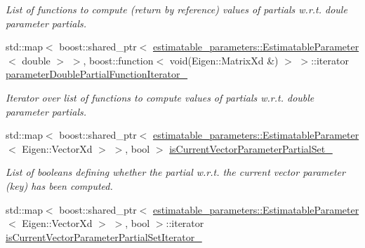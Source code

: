 \begin{DoxyCompactItemize}
\begin{DoxyCompactList}\small\item\em List of functions to compute (return by reference) values of partials w.\+r.\+t. doule parameter partials. \end{DoxyCompactList}\item 
std\+::map$<$ boost\+::shared\+\_\+ptr$<$ \hyperlink{classtudat_1_1estimatable__parameters_1_1EstimatableParameter}{estimatable\+\_\+parameters\+::\+Estimatable\+Parameter}$<$ double $>$ $>$, boost\+::function$<$ void(Eigen\+::\+Matrix\+Xd \&) $>$ $>$\+::iterator \hyperlink{classtudat_1_1orbit__determination_1_1StateDerivativePartial_a4c5d5ef3f5b9328359dfeacf9c47d19c}{parameter\+Double\+Partial\+Function\+Iterator\+\_\+}\hypertarget{classtudat_1_1orbit__determination_1_1StateDerivativePartial_a4c5d5ef3f5b9328359dfeacf9c47d19c}{}\label{classtudat_1_1orbit__determination_1_1StateDerivativePartial_a4c5d5ef3f5b9328359dfeacf9c47d19c}

\begin{DoxyCompactList}\small\item\em Iterator over list of functions to compute values of partials w.\+r.\+t. double parameter partials. \end{DoxyCompactList}\item 
std\+::map$<$ boost\+::shared\+\_\+ptr$<$ \hyperlink{classtudat_1_1estimatable__parameters_1_1EstimatableParameter}{estimatable\+\_\+parameters\+::\+Estimatable\+Parameter}$<$ Eigen\+::\+Vector\+Xd $>$ $>$, bool $>$ \hyperlink{classtudat_1_1orbit__determination_1_1StateDerivativePartial_a94621454b1e34fc7d33d16f3037ce7fb}{is\+Current\+Vector\+Parameter\+Partial\+Set\+\_\+}\hypertarget{classtudat_1_1orbit__determination_1_1StateDerivativePartial_a94621454b1e34fc7d33d16f3037ce7fb}{}\label{classtudat_1_1orbit__determination_1_1StateDerivativePartial_a94621454b1e34fc7d33d16f3037ce7fb}

\begin{DoxyCompactList}\small\item\em List of booleans defining whether the partial w.\+r.\+t. the current vector parameter (key) has been computed. \end{DoxyCompactList}\item 
std\+::map$<$ boost\+::shared\+\_\+ptr$<$ \hyperlink{classtudat_1_1estimatable__parameters_1_1EstimatableParameter}{estimatable\+\_\+parameters\+::\+Estimatable\+Parameter}$<$ Eigen\+::\+Vector\+Xd $>$ $>$, bool $>$\+::iterator \hyperlink{classtudat_1_1orbit__determination_1_1StateDerivativePartial_a6f6acf81cac97d9e3f2beaf8e2bbd91a}{is\+Current\+Vector\+Parameter\+Partial\+Set\+Iterator\+\_\+}\hypertarget{classtudat_1_1orbit__determination_1_1StateDerivativePartial_a6f6acf81cac97d9e3f2beaf8e2bbd91a}{}\label{classtudat_1_1orbit__determination_1_1StateDerivativePartial_a6f6acf81cac97d9e3f2beaf8e2bbd91a}


\end{DoxyCompactItemize}
